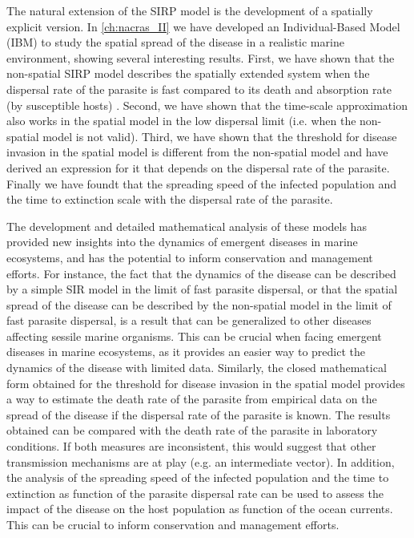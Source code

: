 The natural extension of the SIRP model is the development of a spatially
explicit version. In \cref{ch:nacras_II} we have developed an Individual-Based
Model (IBM) to study the spatial spread of the disease in a realistic marine
environment, showing several interesting results. First, we have shown that the
non-spatial SIRP model describes the spatially extended system when the
dispersal rate of the parasite is fast compared to its death and absorption
rate (by susceptible hosts) \cite{GimenezRomero_2022_RSos}. Second, we have
shown that the time-scale approximation also works in the spatial model in the
low dispersal limit (i.e. when the non-spatial model is not valid). Third, we
have shown that the threshold for disease invasion in the spatial model is
different from the non-spatial model and have derived an expression for it that
depends on the dispersal rate of the parasite. Finally we have foundt that the
spreading speed of the infected population and the time to extinction scale
with the dispersal rate of the parasite.

The development and detailed mathematical analysis of these models has provided
new insights into the dynamics of emergent diseases in marine ecosystems, and
has the potential to inform conservation and management efforts. For instance,
the fact that the dynamics of the disease can be described by a simple SIR
model in the limit of fast parasite dispersal, or that the spatial spread of
the disease can be described by the non-spatial model in the limit of fast
parasite dispersal, is a result that can be generalized to other diseases
affecting sessile marine organisms. This can be crucial when facing emergent
diseases in marine ecosystems, as it provides an easier way to predict the
dynamics of the disease with limited data. Similarly, the closed mathematical
form obtained for the threshold for disease invasion in the spatial model
provides a way to estimate the death rate of the parasite from empirical data
on the spread of the disease if the dispersal rate of the parasite is known.
The results obtained can be compared with the death rate of the parasite in
laboratory conditions. If both measures are inconsistent, this would suggest
that other transmission mechanisms are at play (e.g. an intermediate vector).
In addition, the analysis of the spreading speed of the infected population and
the time to extinction as function of the parasite dispersal rate can be used
to assess the impact of the disease on the host population as function of the
ocean currents. This can be crucial to inform conservation and management
efforts.

